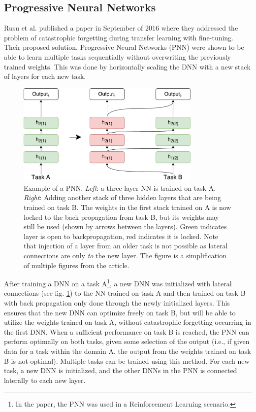 \subsection{Progressive Neural Networks}
Rusu et al. published a paper in September of 2016\cite{progressiveneuralnetworks} where they addressed the problem of catastrophic forgetting during transfer learning with fine-tuning. Their proposed solution, Progressive Neural Networks (PNN) were shown to be able to learn multiple tasks sequentially without overwriting the previously trained weights. This was done by horizontally scaling the DNN with a new stack of layers for each new task.
\begin{figure}[ht]
    \centering
    \includegraphics[width=0.8\textwidth]{Chapters/2.Background/figures/ProgressiveNeuralNet.pdf}
    \caption[Progressive Neural Network]{Example of a PNN. \textit{Left}: a three-layer NN is trained on task A. \textit{Right}: Adding another stack of three hidden layers that are being trained on task B. The weights in the first stack trained on A is now locked to the back propagation from task B, but its weights may still be used (shown by arrows between the layers). Green indicates layer is open to backpropagation, red indicates it is locked. Note that injection of a layer from an older task is not possible as lateral connections are only \textit{to} the new layer. The figure is a simplification of multiple figures from the article\cite{progressiveneuralnetworks}.}
    \label{fig:pnn}
\end{figure}
After training a DNN on a task A\footnote{In the paper, the PNN was used in a Reinforcement Learning scenario.}, a new DNN was initialized with lateral connections (see fig. \ref{fig:pnn}) to the NN trained on task A and then trained on task B with back propagation only done through the newly initialized layers. This ensures that the new DNN can optimize freely on task B, but will be able to utilize the weights trained on task A, without catastrophic forgetting occurring in the first DNN. When a sufficient performance on task B is reached, the PNN can perform optimally on both tasks, given some selection of the output (i.e., if given data for a task within the domain A, the output from the weights trained on task B is not optimal). Multiple tasks can be trained using this method. For each new task, a new DNN is initialized, and the other DNNs in the PNN is connected laterally to each new layer. 

